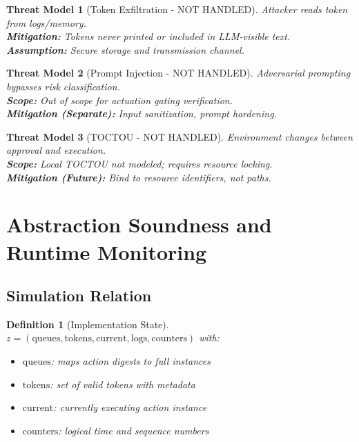 \documentclass[12pt]{article}
\newtheorem{definition}{Definition}[section]
\newtheorem{threat}{Threat Model}[section]
\begin{document}
\begin{threat}[Token Exfiltration - NOT HANDLED]
Attacker reads token from logs/memory.\\
\textbf{Mitigation:} Tokens never printed or included in LLM-visible text.\\
\textbf{Assumption:} Secure storage and transmission channel.
\end{threat}

\begin{threat}[Prompt Injection - NOT HANDLED]
Adversarial prompting bypasses risk classification.\\
\textbf{Scope:} Out of scope for actuation gating verification.\\
\textbf{Mitigation (Separate):} Input sanitization, prompt hardening.
\end{threat}

\begin{threat}[TOCTOU - NOT HANDLED]
Environment changes between approval and execution.\\
\textbf{Scope:} Local TOCTOU not modeled; requires resource locking.\\
\textbf{Mitigation (Future):} Bind to resource identifiers, not paths.
\end{threat}

\section{Abstraction Soundness and Runtime Monitoring}

\subsection{Simulation Relation}

\begin{definition}[Implementation State]
$z = (\text{queues}, \text{tokens}, \text{current}, \text{logs}, \text{counters})$ with:
\begin{itemize}
    \item $\text{queues}$: maps action digests to full instances
    \item $\text{tokens}$: set of valid tokens with metadata
    \item $\text{current}$: currently executing action instance
    \item $\text{counters}$: logical time and sequence numbers
\end{itemize}
\end{definition}
\end{document}
